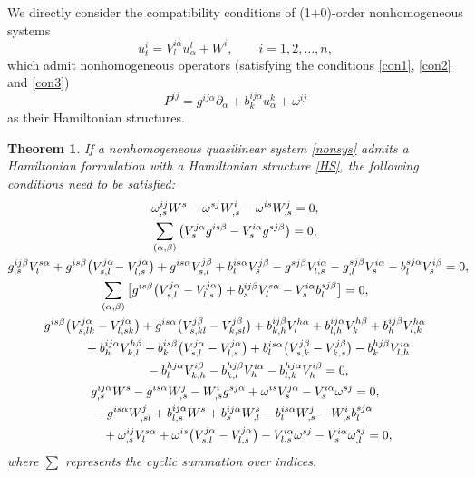 \documentclass[pdftex]{sigma}
\numberwithin{equation}{section}
\newtheorem{Theorem}{Theorem}[section]
\begin{document}
We directly consider the compatibility conditions of (1+0)-order nonhomogeneous systems
\begin{equation}\label{nonsys}
u^i_t=V^{i\alpha}_lu^l_\alpha+W^i, \qquad i=1,2,\dots, n,
\end{equation}
which admit nonhomogeneous operators (satisfying the conditions \eqref{con1}, \eqref{con2} and \eqref{con3})
\begin{equation}\label{HS}
P^{ij}=g^{ij\alpha}\partial_\alpha+b^{ij\alpha}_ku^k_\alpha+\omega^{ij}
\end{equation}
as their Hamiltonian structures.
\begin{Theorem}\label{theorem8}
If a nonhomogeneous quasilinear system \eqref{nonsys} admits a Hamiltonian formulation with a Hamiltonian structure \eqref{HS}, the following conditions need to be satisfied:
\begin{subequations}
\begin{gather}
\omega^{ij}_{,s}W^s-\omega^{sj}W^i_{,s}-\omega^{is}W^j_{,s}=0,\label{syscon1}\\
\sum_{(\alpha,\beta)}\big(V^{j\alpha}_sg^{is\beta}-V^{i\alpha}_sg^{sj\beta}\big)=0,\label{syscon2}\\
g^{ij\beta}_{,s}V^{s\alpha}_l+g^{is\beta}\big(V^{j\alpha}_{s,l}\!-V^{j\alpha}_{l,s}\big)+g^{is\alpha}V^{j\beta}_{s,l}
+b^{is\alpha}_lV^{j\beta}_s-g^{sj\beta}V^{i\alpha}_{l,s}-g^{sj\beta}_{,l}V^{i\alpha}_s-b^{sj\alpha}_lV^{i\beta}_s
=0,\!\!\!\label{syscon3}\\
\sum_{(\alpha,\beta)}\big[g^{is\beta}\big(V^{j\alpha}_{s,l}-V^{j\alpha}_{l,s}\big)+b^{ij\beta}_sV^{s\alpha}_l-V^{i\alpha}_sb^{sj\beta}_l\big]=0,\label{syscon4}\\
g^{is\beta}\big(V^{j\alpha}_{s,lk}-V^{j\alpha}_{l,sk}\big)+g^{is\alpha}\big(V^{j\beta}_{s,kl}-V^{j\beta}_{k,sl}\big)+b^{ij\beta}_{k,h}V^{h\alpha}_l+b^{ij\alpha}_{l,h}V^{h\beta}_k +b^{ij\beta}_hV^{h\alpha}_{l,k}\notag \\
\qquad{}+b^{ij\alpha}_hV^{h\beta}_{k,l}+b^{is\beta}_k\big(V^{j\alpha}_{s,l}
-V^{j\alpha}_{l,s}\big)+b^{is\alpha}_l\big(V^{j\beta}_{s,k}-V^{j\beta}_{k,s}\big) -b^{hj\beta}_kV^{i\alpha}_{l,h}\notag \\
\qquad{}
-b^{hj\alpha}_lV^{i\beta}_{k,h}-b^{hj\beta}_{k,l}V^{i\alpha}_h-b^{hj\alpha}_{l,k}V^{i\beta}_h=0,\label{syscon5}\\
g^{ij\alpha}_{,s}W^s-g^{is\alpha}W^j_{,s}-W^i_{,s}g^{sj\alpha}+\omega^{is}V^{j\alpha}_s-V^{i\alpha}_s\omega^{sj}=0,\label{syscon6}\\
-g^{is\alpha}W^j_{,sl}+b^{ij\alpha}_{l,s}W^s+b^{ij\alpha}_sW^s_{,l}-b^{is\alpha}_lW^j_{,s}-W^i_{,s}b^{sj\alpha}_l \notag \\
\qquad{}+\omega^{ij}_{,s}V^{s\alpha}_l+\omega^{is}\big(V^{j\alpha}_{s,l}-V^{j\alpha}_{l,s}\big)-V^{i\alpha}_{l,s}\omega^{sj}-V^{i\alpha}_s\omega^{sj}_{,l}=0,\label{syscon7}
\end{gather}
\end{subequations}
where $\sum$ represents the cyclic summation over indices.
\end{Theorem}
\end{document}
